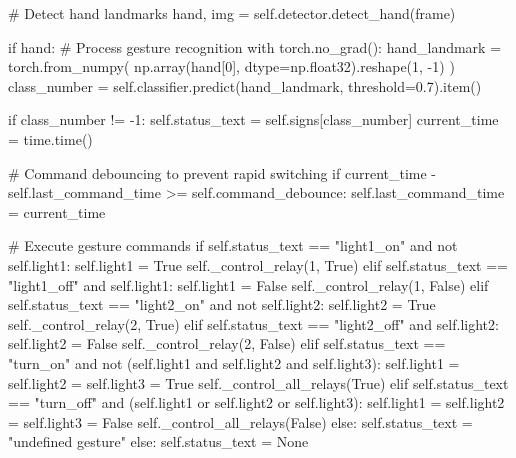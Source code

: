 \begin{aivncodebox}
\begin{python}
                # Detect hand landmarks
                hand, img = self.detector.detect_hand(frame)
                
                if hand:
                    # Process gesture recognition
                    with torch.no_grad():
                        hand_landmark = torch.from_numpy(
                            np.array(hand[0], dtype=np.float32).reshape(1, -1)
                        )
                        class_number = self.classifier.predict(hand_landmark, threshold=0.7).item()
                        
                        if class_number != -1:
                            self.status_text = self.signs[class_number]
                            current_time = time.time()
                            
                            # Command debouncing to prevent rapid switching
                            if current_time - self.last_command_time >= self.command_debounce:
                                self.last_command_time = current_time
                                
                                # Execute gesture commands
                                if self.status_text == "light1_on" and not self.light1:
                                    self.light1 = True
                                    self._control_relay(1, True)
                                elif self.status_text == "light1_off" and self.light1:
                                    self.light1 = False
                                    self._control_relay(1, False)
                                elif self.status_text == "light2_on" and not self.light2:
                                    self.light2 = True
                                    self._control_relay(2, True)
                                elif self.status_text == "light2_off" and self.light2:
                                    self.light2 = False
                                    self._control_relay(2, False)
                                elif self.status_text == "turn_on" and not (self.light1 and self.light2 and self.light3):
                                    self.light1 = self.light2 = self.light3 = True
                                    self._control_all_relays(True)
                                elif self.status_text == "turn_off" and (self.light1 or self.light2 or self.light3):
                                    self.light1 = self.light2 = self.light3 = False
                                    self._control_all_relays(False)
                        else:
                            self.status_text = "undefined gesture"
                else:
                    self.status_text = None
                

\end{python}
\end{aivncodebox}
